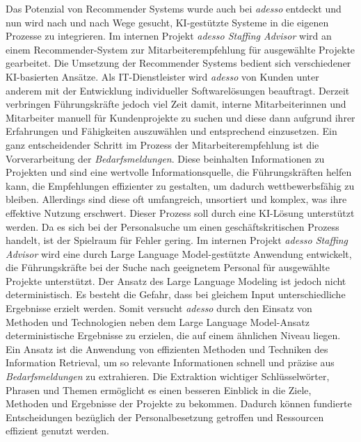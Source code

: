 Das Potenzial von Recommender Systems wurde auch bei \emph{adesso} entdeckt und nun wird nach und nach Wege gesucht, KI-gestützte Systeme in die eigenen Prozesse zu integrieren. Im internen Projekt \emph{adesso Staffing Advisor} wird an einem Recommender-System zur Mitarbeiterempfehlung für ausgewählte Projekte gearbeitet. Die Umsetzung der Recommender Systems bedient sich verschiedener KI-basierten Ansätze. Als IT-Dienstleister wird \emph{adesso} von Kunden unter anderem mit der Entwicklung individueller Softwarelösungen beauftragt. Derzeit verbringen Führungskräfte jedoch viel Zeit damit, interne Mitarbeiterinnen und Mitarbeiter manuell für Kundenprojekte zu suchen und diese dann aufgrund ihrer Erfahrungen und Fähigkeiten auszuwählen und entsprechend einzusetzen. Ein ganz entscheidender Schritt im Prozess der Mitarbeiterempfehlung ist die Vorverarbeitung der \emph{Bedarfsmeldungen}. Diese beinhalten Informationen zu Projekten und sind eine wertvolle Informationsquelle, die Führungskräften helfen kann, die Empfehlungen effizienter zu gestalten, um dadurch wettbewerbsfähig zu bleiben. Allerdings sind diese oft umfangreich, unsortiert und komplex, was ihre effektive Nutzung erschwert. Dieser Prozess soll durch eine KI-Lösung unterstützt werden. Da es sich bei der Personalsuche um einen geschäftskritischen Prozess handelt, ist der Spielraum für Fehler gering. Im internen Projekt \emph{adesso Staffing Advisor} wird eine durch Large Language Model-gestützte Anwendung entwickelt, die Führungskräfte bei der Suche nach geeignetem Personal für ausgewählte Projekte unterstützt. Der Ansatz des Large Language Modeling ist jedoch nicht deterministisch. Es besteht die Gefahr, dass bei gleichem Input unterschiedliche Ergebnisse erzielt werden. Somit versucht \emph{adesso} durch den Einsatz von Methoden und Technologien neben dem Large Language Model-Ansatz deterministische Ergebnisse zu erzielen, die auf einem ähnlichen Niveau liegen. Ein Ansatz ist die Anwendung von effizienten Methoden und Techniken des Information Retrieval, um so relevante Informationen schnell und präzise aus \emph{Bedarfsmeldungen} zu extrahieren. Die Extraktion wichtiger Schlüsselwörter, Phrasen und Themen ermöglicht es einen besseren Einblick in die Ziele, Methoden und Ergebnisse der Projekte zu bekommen. Dadurch können fundierte Entscheidungen bezüglich der Personalbesetzung getroffen und Ressourcen effizient genutzt werden.\\
